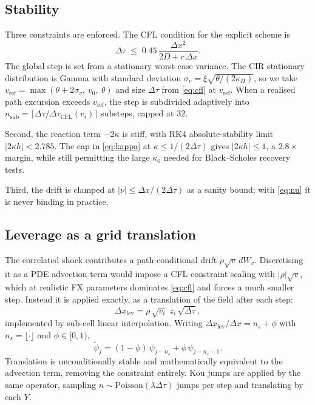 \documentclass[11pt]{article}
\begin{document}
\subsection{Stability}
\label{sec:stab}

Three constraints are enforced. The CFL condition for the explicit scheme
is
\begin{equation}
\Delta\tau \;\le\; 0.45\,\frac{\Delta x^2}{2D + c\,\Delta x} .
\label{eq:cfl}
\end{equation}
The global step is set from a stationary worst-case variance. The CIR
stationary distribution is Gamma with standard deviation
$\sigma_v = \xi\sqrt{\theta/(2\kappa_H)}$, so we take
$v_{\text{ref}} = \max(\theta + 2\sigma_v,\ v_0,\ \theta)$ and size
$\Delta\tau$ from \eqref{eq:cfl} at $v_{\text{ref}}$. When a realised path
excursion exceeds $v_{\text{ref}}$, the step is subdivided adaptively into
$n_{\text{sub}} = \lceil \Delta\tau / \Delta\tau_{\text{CFL}}(v_i)\rceil$
substeps, capped at $32$.

Second, the reaction term $-2\kappa$ is stiff, with RK4 absolute-stability
limit $|2\kappa h| < 2.785$. The cap in \eqref{eq:kappa} at
$\kappa \le 1/(2\Delta\tau)$ gives $|2\kappa h| \le 1$, a $2.8\times$
margin, while still permitting the large $\kappa_0$ needed for
Black--Scholes recovery tests.

Third, the drift is clamped at $|\nu| \le \Delta x/(2\Delta\tau)$ as a
sanity bound; with \eqref{eq:nu} it is never binding in practice.

\subsection{Leverage as a grid translation}
\label{sec:lev}

The correlated shock contributes a path-conditional drift
$\rho\sqrt{v}\,dW_v$. Discretising it as a PDE advection term would impose a
CFL constraint scaling with $|\rho|\sqrt{v}$, which at realistic FX
parameters dominates \eqref{eq:cfl} and forces a much smaller step. Instead
it is applied exactly, as a translation of the field after each step:
\begin{equation}
\Delta x_{\text{lev}} = \rho\,\sqrt{v_i}\;z_i\,\sqrt{\Delta\tau},
\end{equation}
implemented by sub-cell linear interpolation. Writing
$\Delta x_{\text{lev}}/\Delta x = n_s + \phi$ with $n_s = \lfloor\cdot\rfloor$
and $\phi \in [0,1)$,
\begin{equation}
\tilde{\psi}_j = (1-\phi)\,\psi_{j - n_s} + \phi\,\psi_{j - n_s - 1} .
\label{eq:shift}
\end{equation}
Translation is unconditionally stable and mathematically equivalent to the
advection term, removing the constraint entirely. Kou jumps are applied by
the same operator, sampling $n \sim \text{Poisson}(\lambda\Delta\tau)$ jumps
per step and translating by each $Y$.
\end{document}
